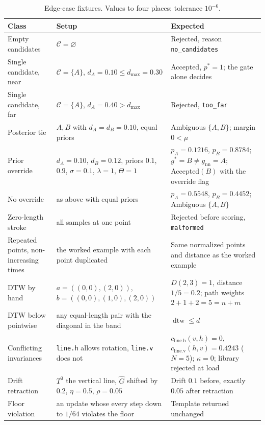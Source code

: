 \begin{table}[h]
\centering
\small
\begin{tabularx}{\textwidth}{@{}lXX@{}}
\toprule
Class & Setup & Expected \\
\midrule
Empty candidates & $\mathcal C=\varnothing$ & Rejected, reason \texttt{no\_candidates} \\
Single candidate, near & $\mathcal C=\{A\}$, $d_A=0.10\le d_{\max}=0.30$ & Accepted, $p^\ast=1$; the gate alone decides \\
Single candidate, far & $\mathcal C=\{A\}$, $d_A=0.40>d_{\max}$ & Rejected, \texttt{too\_far} \\
Posterior tie & $A,B$ with $d_A=d_B=0.10$, equal priors & Ambiguous $\{A,B\}$; margin $0<\mu$ \\
Prior override & $d_A=0.10$, $d_B=0.12$, priors $0.1$, $0.9$, $\sigma=0.1$, $\lambda=1$, $\Theta=1$ & $p_A=0.1216$, $p_B=0.8784$; $g^\ast=B\ne g_{\mathrm{nn}}=A$; Accepted$(B)$ with the override flag \\
No override & as above with equal priors & $p_A=0.5548$, $p_B=0.4452$; Ambiguous $\{A,B\}$ \\
Zero-length stroke & all samples at one point & Rejected before scoring, \texttt{malformed} \\
Repeated points, non-increasing times & the worked example with each point duplicated & Same normalized points and distance as the worked example \\
DTW by hand & $a=((0,0),(2,0))$, $b=((0,0),(1,0),(2,0))$ & $D(2,3)=1$, distance $1/5=0.2$; path weights $2+1+2=5=n+m$ \\
DTW below pointwise & any equal-length pair with the diagonal in the band & $\operatorname{dtw}\le d$ \\
Conflicting invariances & \texttt{line.h} allows rotation, \texttt{line.v} does not & $c_{\mathrm{line.h}}(v,h)=0$, $c_{\mathrm{line.v}}(h,v)=0.4243$ ($N=5$); $\kappa=0$; library rejected at load \\
Drift retraction & $T^0$ the vertical line, $\hat G$ shifted by $0.2$, $\eta=0.5$, $\rho=0.05$ & Drift $0.1$ before, exactly $0.05$ after retraction \\
Floor violation & an update whose every step down to $1/64$ violates the floor & Template returned unchanged \\
\bottomrule
\end{tabularx}
\caption{Edge-case fixtures. Values to four places; tolerance $10^{-6}$.}
\label{tab:edge-fixtures}
\end{table}

